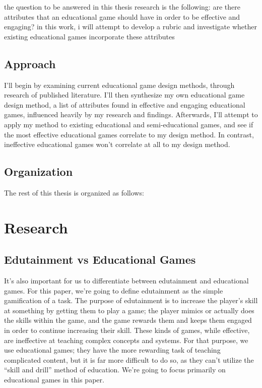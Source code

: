 \documentclass[12pt]{report}
\begin{document}
		the question to be answered in this thesis research is the following: are there attributes that an educational game should have in order to be effective and engaging? in this work, i will attempt to develop a rubric and investigate whether existing educational games incorporate these attributes

	\section{Approach} 
		I'll begin by examining current educational game design methods, through research of published literature. I'll then synthesize my own educational game design method, a list of attributes found in effective and engaging educational games, influenced heavily by my research and findings. Afterwards, I'll attempt to apply my method to existing educational and semi-educational games, and see if the most effective educational games correlate to my design method. In contrast, ineffective educational games won't correlate at all to my design method.

	\section{Organization}
		The rest of this thesis is organized as follows:

\chapter{Research}
	\section{Edutainment vs Educational Games}

		It's also important for us to differentiate between edutainment and educational games. For this paper, we're going to define edutainment as the simple gamification of a task. The purpose of edutainment is to increase the player's skill at something by getting them to play a game; the player mimics or actually does the skills within the game, and the game rewards them and keeps them engaged in order to continue increasing their skill. These kinds of games, while effective, are ineffective at teaching complex concepts and systems. For that purpose, we use educational games; they have the more rewarding task of teaching complicated content, but it is far more difficult to do so, as they can't utilize the “skill and drill” method of education. We're going to focus primarily on educational games in this paper.
\end{document}
